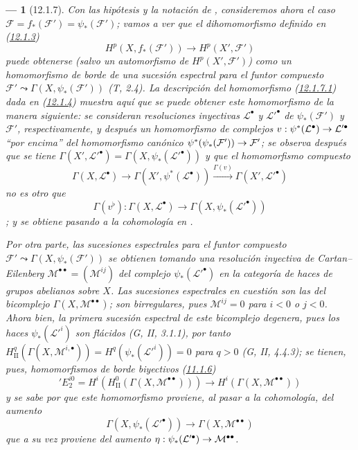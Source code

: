 \documentclass[10pt,oneside,openany]{book}
\theoremstyle{egaenv}\newtheorem*{env}{---}
\theoremstyle{egastatement}
\theoremstyle{egadescription}
\newcommand{\oldpage}[2][]{\marginnote{\normalfont\scriptsize\textbf{#1}\,|\,#2}\ignorespaces}
\renewcommand{\to}{\mathchoice{\longrightarrow}{\rightarrow}{\rightarrow}{\rightarrow}}
\begin{document}
\begin{env}[12.1.7]
\label{0.12.1.7}
\label{0.12.1.7-fr}
Con las hipótesis y la notación de , consideremos ahora el
caso
$\mathcal F=f_*(\mathcal F')=\psi_*(\mathcal F')$; vamos a ver que el dihomomorfismo definido en (\hyperref[0.12.1.3-fr]{12.1.3}) \[
\label{0.12.1.7.1-fr}
\tag{12.1.7.1}
H^p(X,f_*(\mathcal F'))\longrightarrow H^p(X',\mathcal F')
\]
puede obtenerse (salvo un automorfismo de $H^p(X',\mathcal F')$) como un
homomorfismo de borde de una sucesión espectral para el funtor compuesto
$\mathcal F'\leadsto\Gamma(X,\psi_*(\mathcal F'))$ (T, 2.4). La descripción del homomorfismo (\hyperref[0.12.1.7.1-fr]{12.1.7.1}) dada en (\hyperref[0.12.1.4-fr]{12.1.4}) muestra aquí que se puede obtener este homomorfismo de la manera siguiente: se consideran resoluciones inyectivas $\mathcal L^\bullet$ y
$\mathcal L'^\bullet$ de $\psi_*(\mathcal F')$ y $\mathcal F'$,
respectivamente, y después un homomorfismo de complejos
$v:\psi^*(\mathcal L^\bullet)\to\mathcal L'^\bullet$
``por encima'' del homomorfismo canónico
$\psi^*(\psi_*(\mathcal F'))\to\mathcal F'$;
\oldpage[0\textsubscript{III}]{56}
se observa después que se tiene $\Gamma(X',\mathcal L'^\bullet)=\Gamma(X,\psi_*(\mathcal L'^\bullet))$
y que el homomorfismo compuesto
\[
\Gamma(X,\mathcal L^\bullet)\longrightarrow
\Gamma(X',\psi^*(\mathcal L^\bullet))
\xrightarrow{\Gamma(v)}\Gamma(X',\mathcal L'^\bullet)
\]
no es otro que
\[
\label{0.12.1.7.2-fr}
\tag{12.1.7.2}
\Gamma(v^\flat):\Gamma(X,\mathcal L^\bullet)
\longrightarrow\Gamma(X,\psi_*(\mathcal L'^\bullet))
\]
; y  se
obtiene pasando a la cohomología en .

Por otra parte, las sucesiones espectrales para el funtor compuesto
$\mathcal F'\leadsto\Gamma(X,\psi_*(\mathcal F'))$
se obtienen tomando una resolución inyectiva de Cartan--Eilenberg
$\mathcal M^{\bullet\bullet}=(\mathcal M^{ij})$
del complejo $\psi_*(\mathcal L'^\bullet)$ en la categoría de
haces de grupos abelianos sobre $X$.
Las sucesiones espectrales en cuestión son las del bicomplejo
$\Gamma(X,\mathcal M^{\bullet\bullet})$; son birregulares, pues
$\mathcal M^{ij}=0$ para $i<0$ o $j<0$.
Ahora bien, la primera sucesión espectral de este bicomplejo degenera, pues
los haces $\psi_*(\mathcal L'^i)$ son flácidos (G, II, 3.1.1), por tanto $H_{\mathrm{II}}^q(\Gamma(X,\mathcal M^{i,\bullet}))
=H^q(\psi_*(\mathcal L'^i))=0$ para $q>0$ (G, II, 4.4.3); se tienen, pues, homomorfismos de borde \emph{biyectivos} (\hyperref[0.11.1.6-fr]{11.1.6})
\[
\label{0.12.1.7.3-fr}
\tag{12.1.7.3}
'E_2^{i0}=H^i(H_{\mathrm{II}}^0(\Gamma(X,\mathcal M^{\bullet\bullet})))
\longrightarrow H^i(\Gamma(X,\mathcal M^{\bullet\bullet}))
\]
y se sabe por  que este homomorfismo proviene, al pasar
a la cohomología, del aumento
\[
\label{0.12.1.7.4-fr}
\tag{12.1.7.4}
\Gamma(X,\psi_*(\mathcal L'^\bullet))
\longrightarrow\Gamma(X,\mathcal M^{\bullet\bullet})
\]
que a su vez proviene del aumento
$\eta:\psi_*(\mathcal L'^\bullet)\to\mathcal M^{\bullet\bullet}$.


\end{env}
\end{document}
